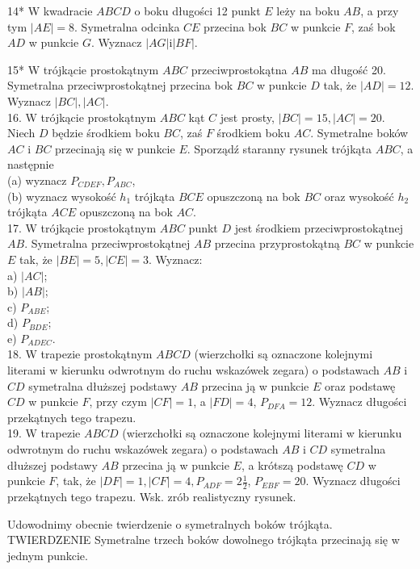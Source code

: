 \documentclass[10pt]{article}
\begin{document}
14* W kwadracie \(A B C D\) o boku długości 12 punkt \(E\) leży na boku \(A B\), a przy tym \(|A E|=8\). Symetralna odcinka \(C E\) przecina bok \(B C\) w punkcie \(F\), zaś bok \(A D\) w punkcie \(G\). Wyznacz \(|A G| \mathrm{i}|B F|\).

15* W trójkącie prostokątnym \(A B C\) przeciwprostokątna \(A B\) ma długość 20. Symetralna przeciwprostokątnej przecina bok \(B C\) w punkcie \(D\) tak, że \(|A D|=12\). Wyznacz \(|B C|,|A C|\).\\
16. W trójkącie prostokątnym \(A B C\) kąt \(C\) jest prosty, \(|B C|=15,|A C|=20\). Niech \(D\) będzie środkiem boku \(B C\), zaś \(F\) środkiem boku \(A C\). Symetralne boków \(A C\) i \(B C\) przecinają się w punkcie \(E\). Sporządź staranny rysunek trójkąta \(A B C\), a następnie\\
(a) wyznacz \(P_{C D E F}, P_{A B C}\),\\
(b) wyznacz wysokość \(h_{1}\) trójkąta \(B C E\) opuszczoną na bok \(B C\) oraz wysokość \(h_{2}\) trójkąta \(A C E\) opuszczoną na bok \(A C\).\\
17. W trójkącie prostokątnym \(A B C\) punkt \(D\) jest środkiem przeciwprostokątnej \(A B\). Symetralna przeciwprostokątnej \(A B\) przecina przyprostokątną \(B C\) w punkcie \(E\) tak, że \(|B E|=5,|C E|=3\). Wyznacz:\\
a) \(|A C|\);\\
b) \(|A B|\);\\
c) \(P_{A B E}\);\\
d) \(P_{B D E}\);\\
e) \(P_{A D E C}\).\\
18. W trapezie prostokątnym \(A B C D\) (wierzchołki są oznaczone kolejnymi literami w kierunku odwrotnym do ruchu wskazówek zegara) o podstawach \(A B\) i \(C D\) symetralna dłuższej podstawy \(A B\) przecina ją w punkcie \(E\) oraz podstawę \(C D\) w punkcie \(F\), przy czym \(|C F|=1\), a \(|F D|=4\), \(P_{D F A}=12\). Wyznacz długości przekątnych tego trapezu.\\
19. W trapezie \(A B C D\) (wierzchołki są oznaczone kolejnymi literami w kierunku odwrotnym do ruchu wskazówek zegara) o podstawach \(A B\) i \(C D\) symetralna dłuższej podstawy \(A B\) przecina ją w punkcie \(E\), a krótszą podstawę \(C D\) w punkcie \(F\), tak, że \(|D F|=1,|C F|=4, P_{A D F}=2 \frac{1}{2}\), \(P_{E B F}=20\). Wyznacz długości przekątnych tego trapezu. Wsk. zrób realistyczny rysunek.

Udowodnimy obecnie twierdzenie o symetralnych boków trójkąta.\\
TWIERDZENIE Symetralne trzech boków dowolnego trójkąta przecinają się w jednym punkcie.
\end{document}
